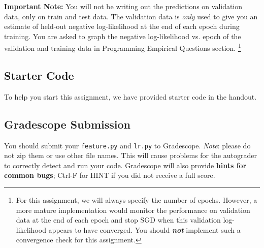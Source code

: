 \documentclass[11pt,addpoints,answers]{exam}
\begin{document}
\begin{notebox}
{\bf Important Note:} You will not be writing out the predictions on validation data, only on train and test data. The validation data is \emph{only} used to give you an estimate of held-out negative log-likelihood at the end of each epoch during training. You are asked to graph the negative log-likelihood vs. epoch of the validation and training data in Programming Empirical Questions section. \footnote{For this assignment, we will always specify the number of epochs. However, a more mature implementation would monitor the performance on validation data at the end of each epoch and stop SGD when this validation log-likelihood appears to have converged. You should \textbf{\emph{not}} implement such a convergence check for this assignment.} 
\end{notebox}


\subsection{Starter Code}\label{startercode}

To help you start this assignment, we have provided starter code in the handout.



\subsection{Gradescope Submission }
You should submit your \texttt{feature.py} and \texttt{lr.py} to Gradescope.
\textit{Note}: please do not zip them or use other file names. This will cause problems for the autograder to correctly detect and run your code. Gradescope will also provide \textbf{hints for common bugs}; Ctrl-F for HINT if you did not receive a full score.
\end{document}
